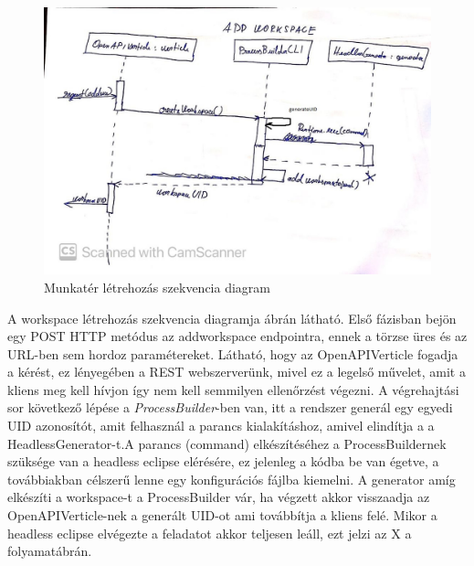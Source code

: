 \begin{figure}[!ht]
	\includegraphics[width=150mm, keepaspectratio]{figures/add_workspace_seq.jpg}
	\caption{Munkatér létrehozás szekvencia diagram}
	\label{fig:addworkspace}
\end{figure}

A workspace létrehozás szekvencia diagramja  ábrán látható. Első fázisban bejön egy POST HTTP metódus az addworkspace endpointra, ennek a törzse üres és az URL-ben sem hordoz paramétereket. Látható, hogy az OpenAPIVerticle fogadja a kérést, ez lényegében a REST webszerverünk, mivel ez a legelső művelet, amit a kliens meg kell hívjon így nem kell semmilyen ellenőrzést végezni. A végrehajtási sor következő lépése a \textit{ProcessBuilder}-ben van, itt a rendszer generál egy egyedi UID azonosítót, amit felhasznál a parancs kialakításhoz, amivel elindítja a a HeadlessGenerator-t.A parancs (command) elkészítéséhez a ProcessBuildernek szüksége van a headless eclipse elérésére, ez jelenleg a kódba be van égetve, a továbbiakban célszerű lenne egy konfigurációs fájlba kiemelni. A generator amíg elkészíti a workspace-t a ProcessBuilder vár, ha végzett akkor visszaadja az OpenAPIVerticle-nek a generált UID-ot ami továbbítja a kliens felé. Mikor a headless eclipse elvégezte a feladatot akkor teljesen leáll, ezt jelzi az X a folyamatábrán.


